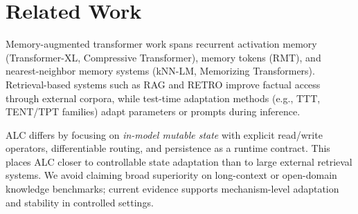 \section{Related Work}
Memory-augmented transformer work spans recurrent activation memory (Transformer-XL, Compressive Transformer), memory tokens (RMT), and nearest-neighbor memory systems (kNN-LM, Memorizing Transformers). Retrieval-based systems such as RAG and RETRO improve factual access through external corpora, while test-time adaptation methods (e.g., TTT, TENT/TPT families) adapt parameters or prompts during inference.

ALC differs by focusing on \emph{in-model mutable state} with explicit read/write operators, differentiable routing, and persistence as a runtime contract. This places ALC closer to controllable state adaptation than to large external retrieval systems. We avoid claiming broad superiority on long-context or open-domain knowledge benchmarks; current evidence supports mechanism-level adaptation and stability in controlled settings.
